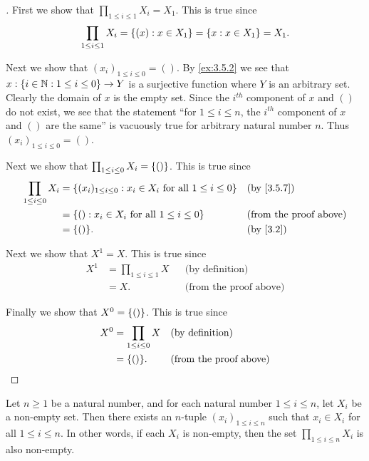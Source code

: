 \begin{proof}[]
	First we show that \(\prod_{1 \leq i \leq 1} X_i = X_1\).
	This is true since
	\[
		\prod_{1 \leq i \leq 1} X_i = \left\lbrace(x) : x \in X_1\right\rbrace = \left\lbrace x : x \in X_1\right\rbrace = X_1.
	\]

	Next we show that \((x_i)_{1 \leq i \leq 0} = ()\).
	By \cref{ex:3.5.2} we see that \(x : \left\lbrace i \in \mathbb{N} : 1 \leq i \leq 0\right\rbrace \to Y\) is a surjective function where \(Y\) is an arbitrary set.
	Clearly the domain of \(x\) is the empty set.
	Since the \(i^{th}\) component of \(x\) and \(()\) do not exist, we see that the statement ``for \(1 \leq i \leq n\), the \(i^{th}\) component of \(x\) and \(()\) are the same'' is vacuously true for arbitrary natural number \(n\).
	Thus \((x_i)_{1 \leq i \leq 0} = ()\).

	Next we show that \(\prod_{1 \leq i \leq 0} X_i = \left\lbrace()\right\rbrace\).
	This is true since
	\begin{align*}
		\prod_{1 \leq i \leq 0} X_i & = \set{(x_i)_{1 \leq i \leq 0} : x_i \in X_i \text{ for all } 1 \leq i \leq 0} &  & \by{3.5.7}                    \\
		                            & = \set{() : x_i \in X_i \text{ for all } 1 \leq i \leq 0}                      &  & \text{(from the proof above)} \\
		                            & = \set{()}.                                                                    &  & \by{3.2}
	\end{align*}

	Next we show that \(X^1 = X\).
	This is true since
	\begin{align*}
		X^1 & = \prod_{1 \leq i \leq 1} X &  & \text{(by definition)}        \\
		    & = X.                        &  & \text{(from the proof above)}
	\end{align*}

	Finally we show that \(X^0 = \left\lbrace()\right\rbrace\).
	This is true since
	\begin{align*}
		X^0 & = \prod_{1 \leq i \leq 0} X &  & \text{(by definition)}        \\
		    & = \set{()}.                 &  & \text{(from the proof above)}
	\end{align*}
\end{proof}

\setcounter{thm}{11}
\begin{lem}\label{3.5.12}
	Let \(n \geq 1\) be a natural number, and for each natural number \(1 \leq i \leq n\), let \(X_i\) be a non-empty set.
	Then there exists an \(n\)-tuple \((x_i)_{1 \leq i \leq n}\) such that \(x_i \in X_i\) for all \(1 \leq i \leq n\).
	In other words, if each \(X_i\) is non-empty, then the set \(\prod_{1 \leq i \leq n} X_i\) is also non-empty.
\end{lem}

